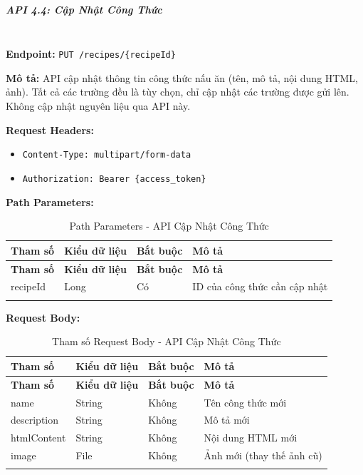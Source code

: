\normalsize

\subparagraph{API 4.4: Cập Nhật Công Thức}~\\

\textbf{Endpoint:} \texttt{PUT /recipes/\{recipeId\}}

\textbf{Mô tả:} API cập nhật thông tin công thức nấu ăn (tên, mô tả, nội dung HTML, ảnh). Tất cả các trường đều là tùy chọn, chỉ cập nhật các trường được gửi lên. Không cập nhật nguyên liệu qua API này.

\textbf{Request Headers:}
\begin{itemize}
    \item \texttt{Content-Type: multipart/form-data}
    \item \texttt{Authorization: Bearer \{access\_token\}}
\end{itemize}

\textbf{Path Parameters:}

\small
\begin{longtable}{|>{\raggedright\arraybackslash}p{3cm}|>{\raggedright\arraybackslash}p{2.5cm}|>{\raggedright\arraybackslash}p{2cm}|>{\raggedright\arraybackslash}p{6cm}|}
\hline
\textbf{Tham số} & \textbf{Kiểu dữ liệu} & \textbf{Bắt buộc} & \textbf{Mô tả} \\
\hline
\endfirsthead
\hline
\textbf{Tham số} & \textbf{Kiểu dữ liệu} & \textbf{Bắt buộc} & \textbf{Mô tả} \\
\hline
\endhead
recipeId & Long & Có & ID của công thức cần cập nhật \\
\hline
\caption{Path Parameters - API Cập Nhật Công Thức}
\end{longtable}

\textbf{Request Body:}

\small
\begin{longtable}{|>{\raggedright\arraybackslash}p{3.5cm}|>{\raggedright\arraybackslash}p{2.5cm}|>{\raggedright\arraybackslash}p{2cm}|>{\raggedright\arraybackslash}p{5.5cm}|}
\hline
\textbf{Tham số} & \textbf{Kiểu dữ liệu} & \textbf{Bắt buộc} & \textbf{Mô tả} \\
\hline
\endfirsthead
\hline
\textbf{Tham số} & \textbf{Kiểu dữ liệu} & \textbf{Bắt buộc} & \textbf{Mô tả} \\
\hline
\endhead
name & String & Không & Tên công thức mới \\
\hline
description & String & Không & Mô tả mới \\
\hline
htmlContent & String & Không & Nội dung HTML mới \\
\hline
image & File & Không & Ảnh mới (thay thế ảnh cũ) \\
\hline
\caption{Tham số Request Body - API Cập Nhật Công Thức}
\end{longtable}

